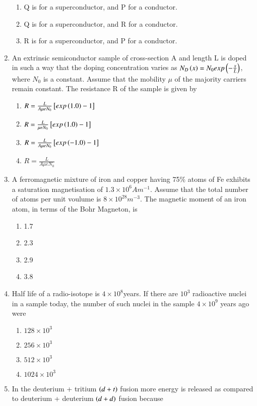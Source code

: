 \documentclass[journal]{IEEEtran}
\numberwithin{equation}{enumi}
\numberwithin{figure}{enumi}
\begin{document}
\begin{enumerate}
\begin{enumerate}
			\item Q is for a superconductor, and P for a conductor.
			\item Q is for a superconductor, and R for a conductor.
			\item R is for a superconductor, and P for a conductor.
		\end{enumerate}
	\item An extrinsic semiconductor sample of cross-section A and length L is doped in such a way that the doping concentration varies as $N_D\left(x\right) = N_0exp\left(-\frac{x}{L}\right)$, where $N_0$ is a constant. Assume that the mobility $\mu$ of the majority carriers remain constant. The resistance R of the sample is given by
		\begin{enumerate}
			\item $R = \frac{L}{A\mu eN_0}{}\left[exp\left(1.0\right) - 1\right]$
			\item $R = \frac{L}{\mu eN_0}{}\left[exp\left(1.0\right) - 1\right]$
			\item $R = \frac{L}{A\mu eN_0}{}\left[exp\left(-1.0\right) - 1\right]$
			\item $R= \frac{L}{A\mu eN_0}$
		\end{enumerate}
	\item A ferromagnetic mixture of iron and copper having 75\% atoms of Fe exhibits a saturation magnetisation of $1.3\times10^6 A m^{-1}$. Assume that the total number of atoms per unit voulume is $8\times10^{28} m^{-3}$. The magnetic moment of an iron atom, in terms of the Bohr Magneton, is
		\begin{enumerate}
			\item 1.7
			\item 2.3
			\item 2.9
			\item 3.8
		\end{enumerate}
	\item Half life of a radio-isotope is $4\times10^8$years. If there are $10^3$ radioactive nuclei in a sample today, the number of such nuclei in the sample $4\times10^9$ years ago were
		\begin{enumerate}
			\item $128\times10^3$
			\item $256\times10^3$
			\item $512\times10^3$
			\item $1024\times10^3$
		\end{enumerate}
	\item In the deuterium + tritium $\left(d+t\right)$ fusion more energy is released as compared to deuterium + deuterium $\left(d+d\right)$ fusion because

\end{enumerate}
\end{document}
